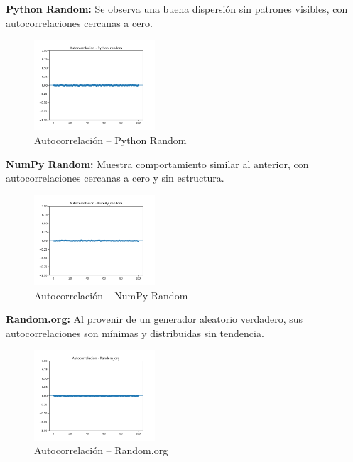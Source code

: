 \documentclass{article}
\begin{document}
\begin{multicols}{2}
\textbf{Python Random:} Se observa una buena dispersión sin patrones visibles, con autocorrelaciones cercanas a cero.

\begin{figure}[H]
\centering
\includegraphics[width=0.4\textwidth]{Imagenes/autocorrelacion_Python_random.png}
\caption{Autocorrelación – Python Random}
\end{figure}

\textbf{NumPy Random:} Muestra comportamiento similar al anterior, con autocorrelaciones cercanas a cero y sin estructura.

\begin{figure}[H]
\centering
\includegraphics[width=0.4\textwidth]{Imagenes/autocorrelacion_NumPy_random.png}
\caption{Autocorrelación – NumPy Random}
\end{figure}

\textbf{Random.org:} Al provenir de un generador aleatorio verdadero, sus autocorrelaciones son mínimas y distribuidas sin tendencia.

\begin{figure}[H]
\centering
\includegraphics[width=0.4\textwidth]{Imagenes/autocorrelacion_Random_org.png}
\caption{Autocorrelación – Random.org}
\end{figure}
\end{multicols}
\end{document}
